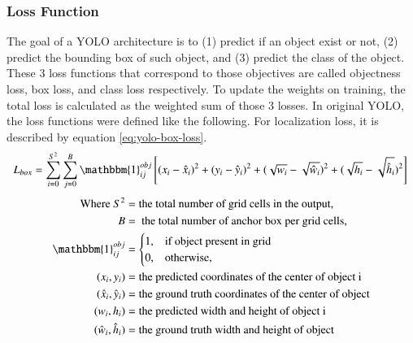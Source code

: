     \subsubsection{Loss Function}
    The goal of a YOLO architecture is to (1) predict if an object exist or not, (2) predict the bounding box of such object,
    and (3) predict the class of the object. These 3 loss functions that correspond to those objectives are called 
    objectness loss, box loss, and class loss respectively. To update the weights on training, the total loss is calculated as 
    the weighted sum of those 3 losses.
    In original YOLO, the loss functions were defined like the following.
    For localization loss, it is described by equation \ref{eq:yolo-box-loss}.
    \begin{equation}
      L_{box} = \sum_{i=0}^{S^2} \sum_{j=0}^B \mathbbm{1}_{ij}^{obj} \left[(x_i - \hat{x}_i)^2 + (y_i - \hat{y}_i)^2 + (\sqrt{w_i}-\sqrt{\hat{w}_i})^2 + (\sqrt{h_i}-\sqrt{\hat{h}_i})^2\right] \\
      \label{eq:yolo-box-loss}
    \end{equation}
    \begin{align*}
    \text{Where}~S^2  &= \text{the total number of grid cells in the output,}\\
    B &= \text{ the total number of anchor box per grid cells,}\\
    \mathbbm{1}_{ij}^{obj} &= \begin{cases}
                                1, & \text{if object present in grid}\\
                                0, & \text{otherwise,}
                              \end{cases} 
                              \\
    (x_i, y_i) &= \text{the predicted coordinates of the center of object i}\\
    (\hat{x}_i, \hat{y}_i) &= \text{the ground truth coordinates of the center of object}\\
    (w_i, h_i) &= \text{the predicted width and height of object i}\\
    (\hat{w}_i, \hat{h}_i) &= \text{the ground truth width and height of object}
    \end{align*}

